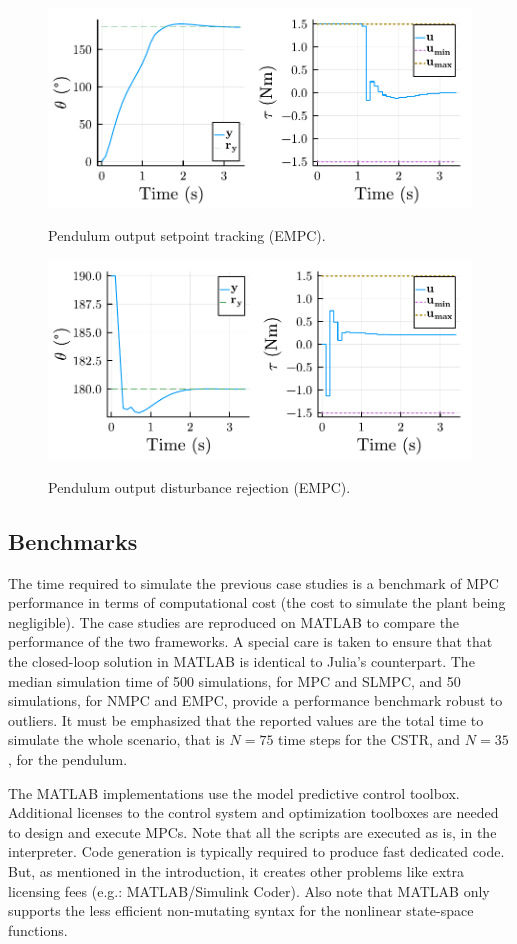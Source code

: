 \begin{figure}[ht]
    \centering
    \caption{Pendulum output setpoint tracking (EMPC).}
    \includegraphics[width=0.5\columnwidth]{fig/plot_EconomMPC1.pdf}
    \label{fig:plot_EconomMPC1}
\end{figure}
%
\begin{figure}[ht]
    \centering
    \caption{Pendulum output disturbance rejection (EMPC).}
    \includegraphics[width=0.5\columnwidth]{fig/plot_EconomMPC2.pdf}
    \label{fig:plot_EconomMPC2}
\end{figure}

\subsection{Benchmarks}
\label{sec:benchmarks}

The time required to simulate the previous case studies is a benchmark of MPC performance in terms of computational cost (the cost to simulate the plant being negligible). The case studies are reproduced on MATLAB to compare the performance of the two frameworks. A special care is taken to ensure that that the closed-loop solution in MATLAB is identical to Julia’s counterpart. The median simulation time of 500 simulations, for MPC and SLMPC, and 50 simulations, for NMPC and EMPC, provide a performance benchmark robust to outliers. It must be emphasized that the reported values are the total time to simulate the whole scenario, that is $N=75$ time steps for the CSTR, and $N=35$, for the pendulum.

The MATLAB implementations use the model predictive control toolbox. Additional licenses to the control system and optimization toolboxes are needed to design and execute MPCs. Note that all the scripts are executed as is, in the interpreter. Code generation is typically required to produce fast dedicated code. But, as mentioned in the introduction, it creates other problems like extra licensing fees (e.g.: MATLAB/Simulink Coder). Also note that MATLAB only supports the less efficient non-mutating syntax for the nonlinear state-space functions.

